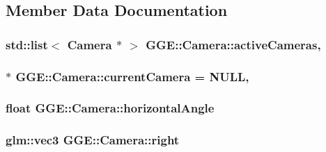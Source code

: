 \subsection{Member Data Documentation}
\hypertarget{class_g_g_e_1_1_camera_a0840a832e6d94923576520715a1e5933}{
\subsubsection[{active\+Cameras}]{\setlength{\rightskip}{0pt plus 5cm}std\+::list$<$ {\bf Camera} $\ast$ $>$ G\+G\+E\+::\+Camera\+::active\+Cameras\hspace{0.3cm}{\ttfamily [static]}, {\ttfamily [private]}}}\label{class_g_g_e_1_1_camera_a0840a832e6d94923576520715a1e5933}
\hypertarget{class_g_g_e_1_1_camera_a500bf2297f52a16911d453c2d8a4dafc}{
\subsubsection[{current\+Camera}]{ $\ast$ G\+G\+E\+::\+Camera\+::current\+Camera = N\+U\+L\+L\hspace{0.3cm}{\ttfamily [static]}, {\ttfamily [private]}}}\label{class_g_g_e_1_1_camera_a500bf2297f52a16911d453c2d8a4dafc}
\hypertarget{class_g_g_e_1_1_camera_af4ce4bd9320cb90a96279e89e971f414}{
\subsubsection[{horizontal\+Angle}]{\setlength{\rightskip}{0pt plus 5cm}float G\+G\+E\+::\+Camera\+::horizontal\+Angle\hspace{0.3cm}{\ttfamily [private]}}}\label{class_g_g_e_1_1_camera_af4ce4bd9320cb90a96279e89e971f414}
\hypertarget{class_g_g_e_1_1_camera_af9a93409b55b7d6fcc5c6ccf20d146fe}{
\subsubsection[{right}]{\setlength{\rightskip}{0pt plus 5cm}glm\+::vec3 G\+G\+E\+::\+Camera\+::right\hspace{0.3cm}{\ttfamily [private]}}}\label{class_g_g_e_1_1_camera_af9a93409b55b7d6fcc5c6ccf20d146fe}
